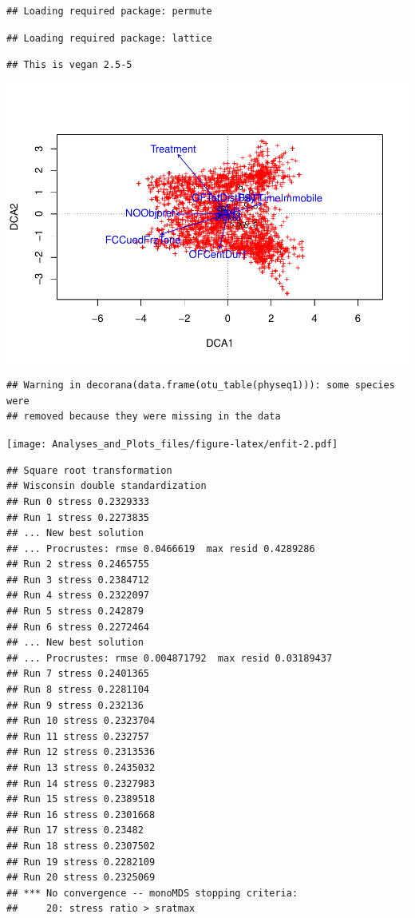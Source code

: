 \documentclass[]{article}
\begin{document}
\begin{verbatim}
## Loading required package: permute
\end{verbatim}

\begin{verbatim}
## Loading required package: lattice
\end{verbatim}

\begin{verbatim}
## This is vegan 2.5-5
\end{verbatim}

\includegraphics{Analyses_and_Plots_files/figure-latex/enfit-1.pdf}

\begin{verbatim}
## Warning in decorana(data.frame(otu_table(physeq1))): some species were
## removed because they were missing in the data
\end{verbatim}

\texttt{[image: Analyses\_and\_Plots\_files/figure-latex/enfit-2.pdf]}

\begin{verbatim}
## Square root transformation
## Wisconsin double standardization
## Run 0 stress 0.2329333 
## Run 1 stress 0.2273835 
## ... New best solution
## ... Procrustes: rmse 0.0466619  max resid 0.4289286 
## Run 2 stress 0.2465755 
## Run 3 stress 0.2384712 
## Run 4 stress 0.2322097 
## Run 5 stress 0.242879 
## Run 6 stress 0.2272464 
## ... New best solution
## ... Procrustes: rmse 0.004871792  max resid 0.03189437 
## Run 7 stress 0.2401365 
## Run 8 stress 0.2281104 
## Run 9 stress 0.232136 
## Run 10 stress 0.2323704 
## Run 11 stress 0.232757 
## Run 12 stress 0.2313536 
## Run 13 stress 0.2435032 
## Run 14 stress 0.2327983 
## Run 15 stress 0.2389518 
## Run 16 stress 0.2301668 
## Run 17 stress 0.23482 
## Run 18 stress 0.2307502 
## Run 19 stress 0.2282109 
## Run 20 stress 0.2325069 
## *** No convergence -- monoMDS stopping criteria:
##     20: stress ratio > sratmax
\end{verbatim}
\end{document}
